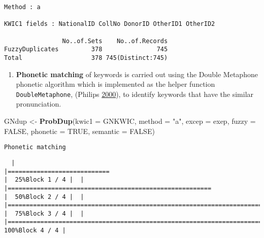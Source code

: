\documentclass[
]{article}
\newenvironment{Shaded}{\begin{snugshade}}{\end{snugshade}}
\newcommand{\DataTypeTok}[1]{\textcolor[rgb]{0.13,0.29,0.53}{#1}}
\newcommand{\KeywordTok}[1]{\textcolor[rgb]{0.13,0.29,0.53}{\textbf{#1}}}
\newcommand{\NormalTok}[1]{#1}
\newcommand{\OtherTok}[1]{\textcolor[rgb]{0.56,0.35,0.01}{#1}}
\newcommand{\StringTok}[1]{\textcolor[rgb]{0.31,0.60,0.02}{#1}}
\providecommand{\tightlist}{%
  \setlength{\itemsep}{0pt}\setlength{\parskip}{0pt}}
\begin{document}
\begin{verbatim}
Method : a

KWIC1 fields : NationalID CollNo DonorID OtherID1 OtherID2
 
                No..of.Sets    No..of.Records
FuzzyDuplicates         378               745
Total                   378 745(Distinct:745)
\end{verbatim}

\begin{enumerate}
\def\labelenumi{\arabic{enumi}.}
\setcounter{enumi}{1}
\tightlist
\item
  \textbf{Phonetic matching} of keywords is carried out using the Double
  Metaphone phonetic algorithm which is implemented as the helper
  function \texttt{DoubleMetaphone}, (Philips
  \protect\hyperlink{ref-p00}{2000}), to identify keywords that have the
  similar pronunciation.
\end{enumerate}

\begin{Shaded}
\begin{Highlighting}[]
\NormalTok{GNdup <-}\StringTok{ }\KeywordTok{ProbDup}\NormalTok{(}\DataTypeTok{kwic1 =}\NormalTok{ GNKWIC, }\DataTypeTok{method =} \StringTok{"a"}\NormalTok{, }\DataTypeTok{excep =}\NormalTok{ exep, }
                 \DataTypeTok{fuzzy =} \OtherTok{FALSE}\NormalTok{,}
                 \DataTypeTok{phonetic =} \OtherTok{TRUE}\NormalTok{,}
                 \DataTypeTok{semantic =} \OtherTok{FALSE}\NormalTok{)}
\end{Highlighting}
\end{Shaded}

\begin{verbatim}
Phonetic matching
\end{verbatim}

\begin{verbatim}
  |                                                                                                                       |============================                                                                                   |  25%Block 1 / 4 |  |                                                                                                                       |========================================================                                                       |  50%Block 2 / 4 |  |                                                                                                                       |===================================================================================                            |  75%Block 3 / 4 |  |                                                                                                                       |===============================================================================================================| 100%Block 4 / 4 |
\end{verbatim}
\end{document}
